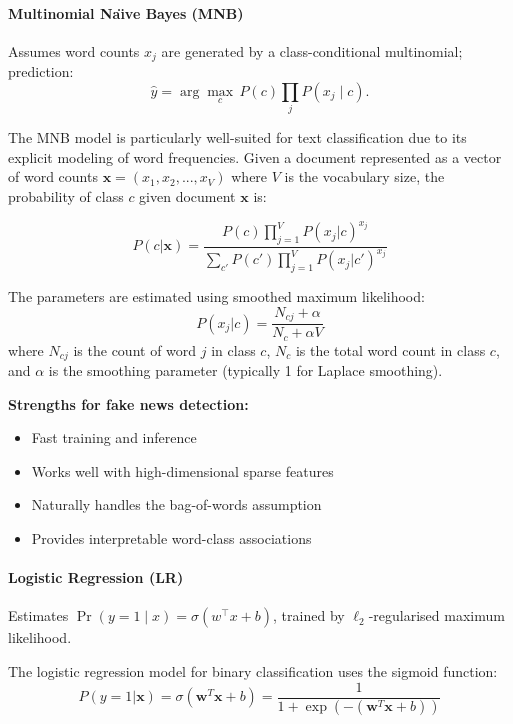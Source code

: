 \documentclass[11pt]{article}
\begin{document}
\paragraph{Multinomial Na\"{\i}ve Bayes (MNB)}
Assumes word counts $x_j$ are generated by a
class-conditional multinomial; prediction:
\[
  \hat{y}=\arg\max_c\,P(c)\prod_j P(x_j\mid c).
\]

The MNB model is particularly well-suited for text classification due to its explicit modeling of word frequencies. Given a document represented as a vector of word counts $\mathbf{x} = (x_1, x_2, ..., x_V)$ where $V$ is the vocabulary size, the probability of class $c$ given document $\mathbf{x}$ is:

\begin{equation}
P(c|\mathbf{x}) = \frac{P(c) \prod_{j=1}^{V} P(x_j|c)^{x_j}}{\sum_{c'} P(c') \prod_{j=1}^{V} P(x_j|c')^{x_j}}
\end{equation}

The parameters are estimated using smoothed maximum likelihood:
\begin{equation}
P(x_j|c) = \frac{N_{cj} + \alpha}{N_c + \alpha V}
\end{equation}
where $N_{cj}$ is the count of word $j$ in class $c$, $N_c$ is the total word count in class $c$, and $\alpha$ is the smoothing parameter (typically 1 for Laplace smoothing).

\textbf{Strengths for fake news detection:}
\begin{itemize}
\item Fast training and inference
\item Works well with high-dimensional sparse features
\item Naturally handles the bag-of-words assumption
\item Provides interpretable word-class associations
\end{itemize}

\paragraph{Logistic Regression (LR)}
Estimates
$\Pr(y\!=\!1\mid x)=\sigma(w^\top x + b)$, trained by
$\ell_2$-regularised maximum likelihood.

The logistic regression model for binary classification uses the sigmoid function:
\begin{equation}
P(y=1|\mathbf{x}) = \sigma(\mathbf{w}^T\mathbf{x} + b) = \frac{1}{1 + \exp(-(\mathbf{w}^T\mathbf{x} + b))}
\end{equation}
\end{document}
